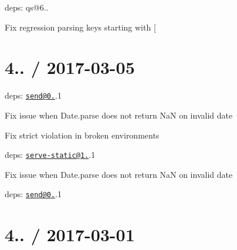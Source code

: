 \begin{DoxyItemize}
\item deps\+: qs@6..
\begin{DoxyItemize}
\item Fix regression parsing keys starting with {\ttfamily \mbox{[}}
\end{DoxyItemize}
\end{DoxyItemize}

\section*{4.. / 2017-\/03-\/05 }


\begin{DoxyItemize}
\item deps\+: \href{mailto:send@0.15}{\tt send@0.}.1
\begin{DoxyItemize}
\item Fix issue when {\ttfamily Date.\+parse} does not return {\ttfamily NaN} on invalid date
\item Fix strict violation in broken environments
\end{DoxyItemize}
\item deps\+: \href{mailto:serve-static@1.12}{\tt serve-\/static@1.}.1
\begin{DoxyItemize}
\item Fix issue when {\ttfamily Date.\+parse} does not return {\ttfamily NaN} on invalid date
\item deps\+: \href{mailto:send@0.15}{\tt send@0.}.1
\end{DoxyItemize}
\end{DoxyItemize}

\section*{4.. / 2017-\/03-\/01 }


